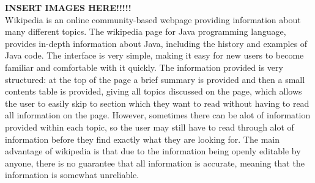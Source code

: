 \documentclass{article}
\begin{document}
\textbf{INSERT IMAGES HERE!!!!!}\\

Wikipedia is an online community-based webpage providing information about many different topics. The wikipedia page for Java programming language, provides in-depth information about Java, including the history and examples of Java code. The interface is very simple, making it easy for new users to become familiar and comfortable with it quickly. The information provided is very structured: at the top of the page a brief summary is provided and then a small contents table is provided, giving all topics discussed on the page, which allows the user to easily skip to section which they want to read without having to read all information on the page. However, sometimes there can be alot of information provided within each topic, so the user may still have to read through alot of information before they find exactly what they are looking for. The main advantage of wikipedia is that due to the information being openly editable by anyone, there is no guarantee that all information is accurate, meaning that the information is somewhat unreliable.\\
\end{document}
